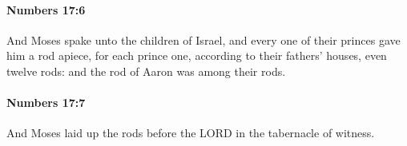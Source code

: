 		\paragraph{Numbers 17:6} %
			\label{NUMBERS-17-6}

			And Moses spake unto the children of Israel, and every one of their princes gave him a rod apiece, for each prince one, according to their fathers’ houses, even twelve rods: and the rod of Aaron was among their rods.


		\paragraph{Numbers 17:7} %
			\label{NUMBERS-17-7}

			And Moses laid up the rods before the LORD in the tabernacle of witness.


